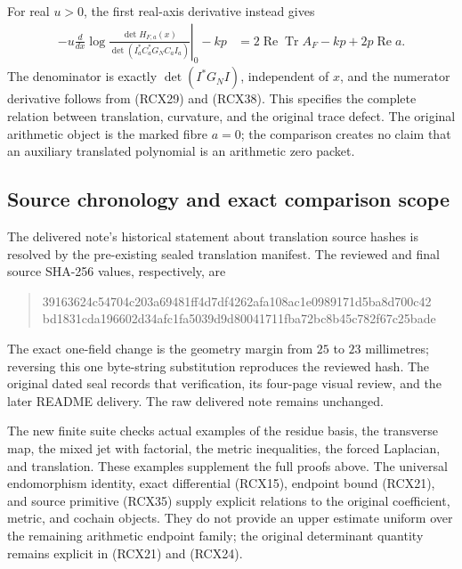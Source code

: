 For real \(u>0\), the first real-axis derivative instead gives
\[
\begin{split}
 -u\left.\frac d{dx}
   \log\frac{\det H_{F,a}(x)}
                 {\det(I_a^*C_a^*G_NC_aI_a)}\right|_0-kp
   &=2\operatorname{Re}\operatorname{Tr}A_F-kp
       +2p\operatorname{Re}a .
\end{split}\tag{RCX39}
\]
The denominator is exactly \(\det(I^*G_NI)\), independent of
\(x\), and the numerator derivative follows from (RCX29) and
(RCX38). This specifies the complete relation between translation,
curvature, and the original trace defect. The original arithmetic
object is the marked fibre \(a=0\); the comparison creates no claim
that an auxiliary translated polynomial is an arithmetic zero packet.

\subsection{Source chronology and exact comparison scope}

The delivered note's historical statement about translation source
hashes is resolved by the pre-existing sealed translation manifest.
The reviewed and final source SHA-256 values, respectively, are
\begin{quote}\small\ttfamily
\noindent
39163624c54704c203a69481ff4d7df4262afa108ac1e0989171d5ba8d700c42\\
bd1831cda196602d34afc1fa5039d9d80041711fba72bc8b45c782f67c25bade
\end{quote}
The exact one-field change is the geometry margin from \(25\) to
\(23\) millimetres; reversing this one byte-string substitution
reproduces the reviewed hash. The original dated seal records
that verification, its four-page visual review, and the later
README delivery. The raw delivered note remains unchanged.

The new finite suite checks actual examples of the residue basis,
the transverse map, the mixed jet with factorial, the metric
inequalities, the forced Laplacian, and translation. These examples
supplement the full proofs above. The universal endomorphism
identity, exact differential (RCX15), endpoint bound (RCX21), and
source primitive (RCX35) supply explicit relations to the original
coefficient, metric, and cochain objects. They do not provide an
upper estimate uniform over the remaining arithmetic endpoint
family; the original determinant quantity remains explicit in
(RCX21) and (RCX24).

